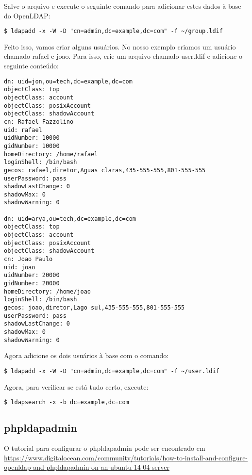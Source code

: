 Salve o arquivo e execute o seguinte comando para adicionar estes dados à base do OpenLDAP:
\begin{verbatim}
$ ldapadd -x -W -D "cn=admin,dc=example,dc=com" -f ~/group.ldif
\end{verbatim}

Feito isso, vamos criar alguns usuários. No nosso exemplo criamos um usuário chamado rafael e joao.
Para isso, crie um arquivo chamado user.ldif e adicione o seguinte conteúdo:
\begin{verbatim}
dn: uid=jon,ou=tech,dc=example,dc=com
objectClass: top
objectClass: account
objectClass: posixAccount
objectClass: shadowAccount
cn: Rafael Fazzolino
uid: rafael
uidNumber: 10000
gidNumber: 10000
homeDirectory: /home/rafael
loginShell: /bin/bash
gecos: rafael,diretor,Aguas claras,435-555-555,801-555-555
userPassword: pass
shadowLastChange: 0
shadowMax: 0
shadowWarning: 0

dn: uid=arya,ou=tech,dc=example,dc=com
objectClass: top
objectClass: account
objectClass: posixAccount
objectClass: shadowAccount
cn: Joao Paulo
uid: joao
uidNumber: 20000
gidNumber: 20000
homeDirectory: /home/joao
loginShell: /bin/bash
gecos: joao,diretor,Lago sul,435-555-555,801-555-555
userPassword: pass
shadowLastChange: 0
shadowMax: 0
shadowWarning: 0
\end{verbatim}

Agora adicione os dois usuários à base com o comando:
\begin{verbatim}
$ ldapadd -x -W -D "cn=admin,dc=example,dc=com" -f ~/user.ldif
\end{verbatim}

Agora, para verificar se está tudo certo, execute:

\begin{verbatim}
$ ldapsearch -x -b dc=example,dc=com
\end{verbatim}

\subsection{phpldapadmin}

O tutorial para configurar o phpldapadmin pode ser encontrado em \url{https://www.digitalocean.com/community/tutorials/how-to-install-and-configure-openldap-and-phpldapadmin-on-an-ubuntu-14-04-server}


